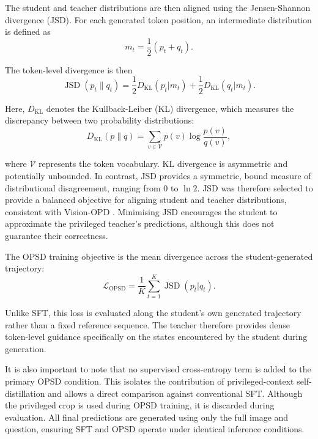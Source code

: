 The student and teacher distributions are then aligned using the Jensen-Shannon divergence (JSD). For each
generated token position, an intermediate distribution is defined as
\[m_t = 
\frac{1}{2}
\left(
p_t+q_t
\right).
\]

The token-level divergence is then
\[\operatorname{JSD}(p_t\|q_t) = 
\frac{1}{2}
D_{\mathrm{KL}}(p_t|m_t)
+
\frac{1}{2}
D_{\mathrm{KL}}(q_t|m_t).
\]

Here, $D_{\mathrm{KL}}$ denotes the Kullback-Leiber (KL) divergence, which measures the 
discrepancy between two probability distributions:
\[
D_{\mathrm{KL}}(p\|q)
=\sum_{v \in \mathcal{V}}
p(v)\log\frac{p(v)}{q(v)},
\]

where $\mathcal{V}$ represents the token vocabulary. KL divergence is asymmetric and potentially 
unbounded. In contrast, JSD provides a symmetric, bound measure of distributional disagreement, ranging 
from $0$ to $\ln 2$. JSD was therefore selected to provide a balanced objective for aligning 
student and teacher distributions, consistent with Vision-OPD \parencite{yuan2026vision}. Minimising 
JSD encourages the student to approximate the privileged teacher's predictions, although this does not
guarantee their correctness.

The OPSD training objective is
the mean divergence across the student-generated trajectory:
\[\mathcal{L}_{\mathrm{OPSD}} = 
\frac{1}{K}
\sum_{t=1}^{K}
\operatorname{JSD}(p_t|q_t).
\]

Unlike SFT, this loss is evaluated along the student's own generated trajectory rather than a 
fixed reference sequence. The teacher therefore provides dense token-level guidance specifically on the 
states encountered by the student during generation.

It is also important to note that no supervised cross-entropy term is added to the primary OPSD condition. 
This isolates the contribution of privileged-context self-distillation and allows a direct comparison
against conventional SFT. Although the privileged crop is used during OPSD training, it is discarded
during evaluation. All final predictions are generated using only the full image and question, ensuring
SFT and OPSD operate under identical inference conditions.